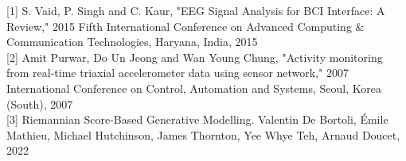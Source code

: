 \documentclass{article}
\begin{document}








[1] S. Vaid, P. Singh and C. Kaur, "EEG Signal Analysis for BCI Interface: A Review," 2015 Fifth International Conference on Advanced Computing & Communication Technologies, Haryana, India, 2015 \\

[2] Amit Purwar, Do Un Jeong and Wan Young Chung, "Activity monitoring from real-time triaxial accelerometer data using sensor network," 2007 International Conference on Control, Automation and Systems, Seoul, Korea (South), 2007 \\

[3] Riemannian Score-Based Generative Modelling. 
Valentin De Bortoli, Émile Mathieu, Michael Hutchinson, James Thornton, Yee Whye Teh, Arnaud Doucet, 2022 \\
\end{document}
